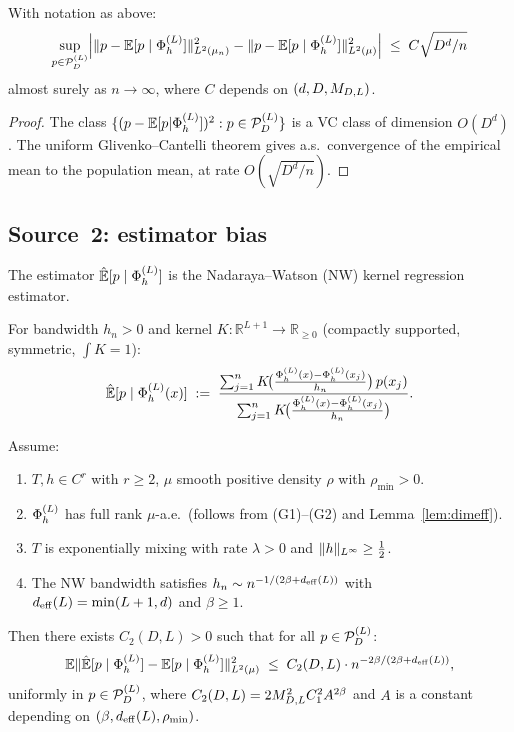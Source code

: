 \begin{lemma}
\label{lem:source1}
With notation as above:
\[
  \sup_{p \in \mathcal{P}_D^{(L)}}
  \Bigl|
    \|p - \mathbb{E}[p \mid \Phi_h^{(L)}]\|_{L^{2}(\mu_n)}^2
    - \|p - \mathbb{E}[p \mid \Phi_h^{(L)}]\|_{L^{2}(\mu)}^2
  \Bigr|
  \;\leq\; C\sqrt{D^d/n}
\]
almost surely as $n \to \infty$, where $C$ depends on $(d,D,M_{D,L})$.
\end{lemma}

\begin{proof}
The class $\{(p - \mathbb{E}[p|\Phi_h^{(L)}])^2 : p \in \mathcal{P}_D^{(L)}\}$ is a VC class
of dimension $O(D^d)$.
The uniform Glivenko--Cantelli theorem \cite{Gyorfi2002} gives a.s.\ convergence
of the empirical mean to the population mean, at rate $O(\sqrt{D^d/n})$.
\end{proof}

\subsection{Source~2: estimator bias}
\label{subsec:source2}

The estimator $\hat{\mathbb{E}}[p \mid \Phi_h^{(L)}]$ is the Nadaraya--Watson (NW) kernel
regression estimator.

\begin{definition}
\label{def:nw}
For bandwidth $h_n > 0$ and kernel $K : \mathbb{R}^{L+1} \to \mathbb{R}_{\geq 0}$
(compactly supported, symmetric, $\int K = 1$):
\[
  \Ehat[p \mid \PhiL(x)]
  \;:=\;
  \frac{\sum_{j=1}^n K\!\bigl(\tfrac{\PhiL(x)-\PhiL(x_j)}{h_n}\bigr)\,p(x_j)}%
       {\sum_{j=1}^n K\!\bigl(\tfrac{\PhiL(x)-\PhiL(x_j)}{h_n}\bigr)}.
\]
\end{definition}

\begin{proposition}
\label{prop:source2}
Assume:
\begin{enumerate}[label=(\roman*)]
  \item $T, h \in C^r$ with $r \geq 2$, $\mu$ smooth positive density $\rho$
        with $\rho_{\min} > 0$.
  \item $\Phi_h^{(L)}$ has full rank $\mu$-a.e.\ (follows from (G1)--(G2) and
        Lemma~\ref{lem:dimeff}).
  \item $T$ is exponentially mixing with rate $\lambda > 0$ and
        $\|h\|_{L^{\infty}} \geq \frac{1}{2}$.
  \item The NW bandwidth satisfies $h_n \sim n^{-1/(2\beta+d_{\mathrm{eff}}(L))}$
        with $d_{\mathrm{eff}}(L) = \min(L+1, d)$ and $\beta \geq 1$.
\end{enumerate}
Then there exists $C_2(D,L) > 0$ such that for all $p \in \mathcal{P}_D^{(L)}$:
\[
  \mathbb{E}\|\hat{\mathbb{E}}[p \mid \Phi_h^{(L)}] - \mathbb{E}[p \mid \Phi_h^{(L)}]\|_{L^{2}(\mu)}^2
  \;\leq\; C_2(D,L)\cdot n^{-2\beta/(2\beta+d_{\mathrm{eff}}(L))},
\]
uniformly in $p \in \mathcal{P}_D^{(L)}$, where $C_2(D,L) = 2M_{D,L}^2 C_1^2 A^{2\beta}$ and
$A$ is a constant depending on $(\beta, d_{\mathrm{eff}}(L), \rho_{\min})$.
\end{proposition}

